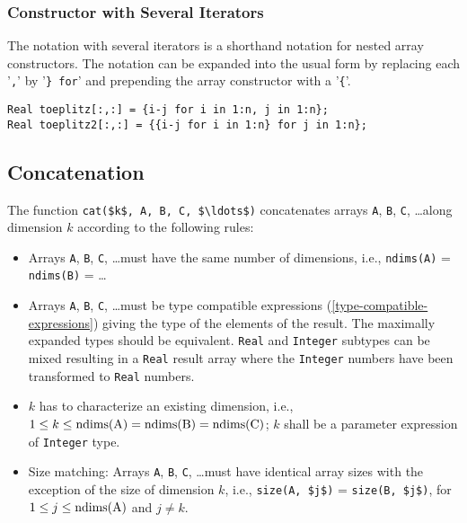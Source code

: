 \subsubsection{Constructor with Several Iterators}\label{array-constructor-with-several-iterators}\label{constructor-with-several-iterators}

The notation with several iterators is a shorthand notation for nested
array constructors. The notation can be expanded into the usual form by
replacing each '\lstinline!,!' by '\lstinline!} for!' and prepending the array constructor with
a '\lstinline!{!'.

\begin{example}
\begin{lstlisting}[language=modelica]
Real toeplitz[:,:] = {i-j for i in 1:n, j in 1:n};
Real toeplitz2[:,:] = {{i-j for i in 1:n} for j in 1:n};
\end{lstlisting}
\end{example}

\subsection{Concatenation}\label{array-concatenation}\label{concatenation}

The function \lstinline!cat($k$, A, B, C, $\ldots$)! concatenates arrays \lstinline!A!, \lstinline!B!, \lstinline!C!, \ldots along dimension $k$ according to the following rules:
\begin{itemize}
\item
  Arrays \lstinline!A!, \lstinline!B!, \lstinline!C!, \ldots must have the same number of dimensions, i.e., \lstinline!ndims(A)! = \lstinline!ndims(B)! = \ldots
\item
  Arrays \lstinline!A!, \lstinline!B!, \lstinline!C!, \ldots must be type compatible expressions (\cref{type-compatible-expressions}) giving the type of the elements of the result.
The maximally expanded types should be equivalent.
  \lstinline!Real! and \lstinline!Integer! subtypes can be mixed resulting in a \lstinline!Real! result array where the \lstinline!Integer! numbers have been transformed to \lstinline!Real! numbers.
\item
  $k$ has to characterize an existing dimension, i.e., $1 \leq k \leq \text{\lstinline!ndims(A)!} = \text{\lstinline!ndims(B)!} = \text{\lstinline!ndims(C)!}$; $k$ shall be a parameter expression of \lstinline!Integer! type.
\item
  Size matching: Arrays \lstinline!A!, \lstinline!B!, \lstinline!C!, \ldots must have identical array sizes with the exception of the size of dimension $k$, i.e., \lstinline!size(A, $j$)! = \lstinline!size(B, $j$)!, for $1 \leq j \leq \text{\lstinline!ndims(A)!}$ and $j \neq k$.
\end{itemize}

